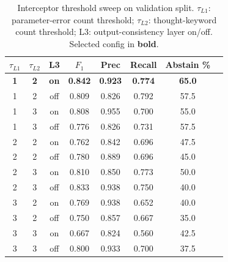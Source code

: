 \begin{table}[t]
\centering\small
\caption{Interceptor threshold sweep on validation split. $\tau_{L1}$: parameter-error count threshold; $\tau_{L2}$: thought-keyword count threshold; L3: output-consistency layer on/off. Selected config in \textbf{bold}.}
\label{tab:sweep}
\begin{tabular}{cccccccc}
\toprule
$\tau_{L1}$ & $\tau_{L2}$ & L3 & $F_1$ & Prec & Recall & Abstain \% \\
\midrule
\textbf{1} & \textbf{2} & \textbf{on} & \textbf{0.842} & \textbf{0.923} & \textbf{0.774} & \textbf{65.0} \\
1 & 2 & off & 0.809 & 0.826 & 0.792 & 57.5 \\
1 & 3 & on & 0.808 & 0.955 & 0.700 & 55.0 \\
1 & 3 & off & 0.776 & 0.826 & 0.731 & 57.5 \\
2 & 2 & on & 0.762 & 0.842 & 0.696 & 47.5 \\
2 & 2 & off & 0.780 & 0.889 & 0.696 & 45.0 \\
2 & 3 & on & 0.810 & 0.850 & 0.773 & 50.0 \\
2 & 3 & off & 0.833 & 0.938 & 0.750 & 40.0 \\
3 & 2 & on & 0.769 & 0.938 & 0.652 & 40.0 \\
3 & 2 & off & 0.750 & 0.857 & 0.667 & 35.0 \\
3 & 3 & on & 0.667 & 0.824 & 0.560 & 42.5 \\
3 & 3 & off & 0.800 & 0.933 & 0.700 & 37.5 \\
\bottomrule
\end{tabular}
\end{table}